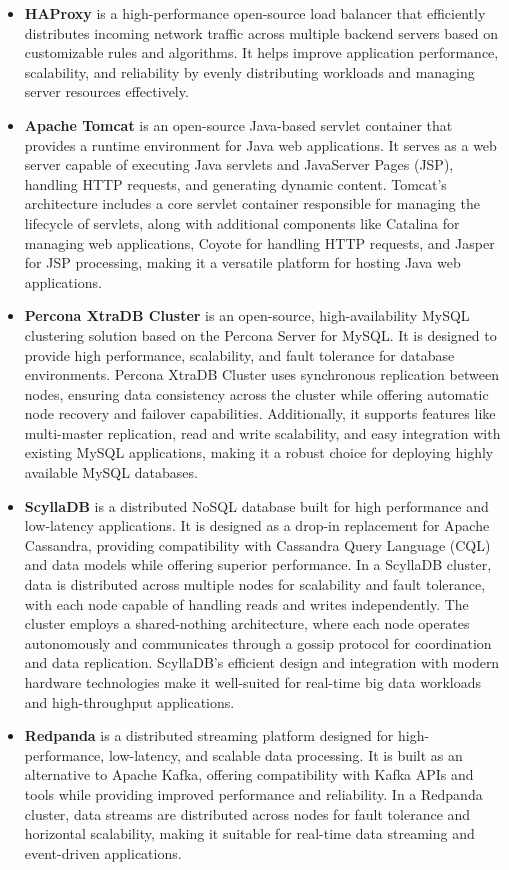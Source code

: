 \documentclass[12pt,a4paper,oneside]{report}
\begin{document}
\begin{itemize}
\item \textbf{HAProxy} is a high-performance open-source load balancer that efficiently distributes incoming network traffic across multiple backend servers based on customizable rules and algorithms. It helps improve application performance, scalability, and reliability by evenly distributing workloads and managing server resources effectively.

\item \textbf{Apache Tomcat} is an open-source Java-based servlet container that provides a runtime environment for Java web applications. It serves as a web server capable of executing Java servlets and JavaServer Pages (JSP), handling HTTP requests, and generating dynamic content. Tomcat's architecture includes a core servlet container responsible for managing the lifecycle of servlets, along with additional components like Catalina for managing web applications, Coyote for handling HTTP requests, and Jasper for JSP processing, making it a versatile platform for hosting Java web applications.

\item \textbf{Percona XtraDB Cluster} is an open-source, high-availability MySQL clustering solution based on the Percona Server for MySQL. It is designed to provide high performance, scalability, and fault tolerance for database environments. Percona XtraDB Cluster uses synchronous replication between nodes, ensuring data consistency across the cluster while offering automatic node recovery and failover capabilities. Additionally, it supports features like multi-master replication, read and write scalability, and easy integration with existing MySQL applications, making it a robust choice for deploying highly available MySQL databases.

\item \textbf{ScyllaDB} is a distributed NoSQL database built for high performance and low-latency applications. It is designed as a drop-in replacement for Apache Cassandra, providing compatibility with Cassandra Query Language (CQL) and data models while offering superior performance. In a ScyllaDB cluster, data is distributed across multiple nodes for scalability and fault tolerance, with each node capable of handling reads and writes independently. The cluster employs a shared-nothing architecture, where each node operates autonomously and communicates through a gossip protocol for coordination and data replication. ScyllaDB's efficient design and integration with modern hardware technologies make it well-suited for real-time big data workloads and high-throughput applications.
\item \textbf{Redpanda} is a distributed streaming platform designed for high-performance, low-latency, and scalable data processing. It is built as an alternative to Apache Kafka, offering compatibility with Kafka APIs and tools while providing improved performance and reliability. In a Redpanda cluster, data streams are distributed across nodes for fault tolerance and horizontal scalability, making it suitable for real-time data streaming and event-driven applications.
\end{itemize}
\end{document}
